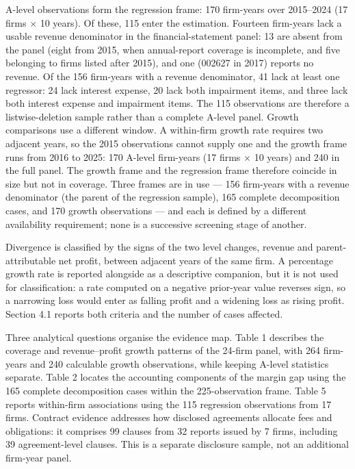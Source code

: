 \documentclass[review,3p,times]{elsarticle}
\begin{document}
A-level observations form the regression frame: 170 firm-years over 2015--2024 (17 firms \ensuremath{\times} 10 years). Of these, 115 enter the estimation. Fourteen firm-years lack a usable revenue denominator in the financial-statement panel: 13 are absent from the panel (eight from 2015, when annual-report coverage is incomplete, and five belonging to firms listed after 2015), and one (002627 in 2017) reports no revenue. Of the 156 firm-years with a revenue denominator, 41 lack at least one regressor: 24 lack interest expense, 20 lack both impairment items, and three lack both interest expense and impairment items. The 115 observations are therefore a listwise-deletion sample rather than a complete A-level panel. Growth comparisons use a different window. A within-firm growth rate requires two adjacent years, so the 2015 observations cannot supply one and the growth frame runs from 2016 to 2025: 170 A-level firm-years (17 firms \ensuremath{\times} 10 years) and 240 in the full panel. The growth frame and the regression frame therefore coincide in size but not in coverage. Three frames are in use --- 156 firm-years with a revenue denominator (the parent of the regression sample), 165 complete decomposition cases, and 170 growth observations --- and each is defined by a different availability requirement; none is a successive screening stage of another.

Divergence is classified by the signs of the two level changes, revenue and parent-attributable net profit, between adjacent years of the same firm. A percentage growth rate is reported alongside as a descriptive companion, but it is not used for classification: a rate computed on a negative prior-year value reverses sign, so a narrowing loss would enter as falling profit and a widening loss as rising profit. Section 4.1 reports both criteria and the number of cases affected.

Three analytical questions organise the evidence map. Table 1 describes the coverage and revenue--profit growth patterns of the 24-firm panel, with 264 firm-years and 240 calculable growth observations, while keeping A-level statistics separate. Table 2 locates the accounting components of the margin gap using the 165 complete decomposition cases within the 225-observation frame. Table 5 reports within-firm associations using the 115 regression observations from 17 firms. Contract evidence addresses how disclosed agreements allocate fees and obligations: it comprises 99 clauses from 32 reports issued by 7 firms, including 39 agreement-level clauses. This is a separate disclosure sample, not an additional firm-year panel.
\end{document}
